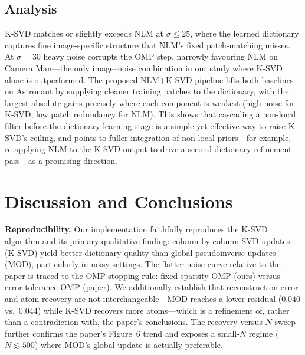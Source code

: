 \documentclass[conference]{IEEEtran}
\begin{document}
\subsection{Analysis}

K-SVD matches or slightly exceeds NLM at $\sigma\leq25$, where
the learned dictionary captures fine image-specific structure
that NLM's fixed patch-matching misses.
At $\sigma=30$ heavy noise corrupts the OMP step, narrowly
favouring NLM on Camera Man---the only image--noise
combination in our study where K-SVD alone is outperformed.
The proposed NLM+K-SVD pipeline lifts both baselines on
Astronaut by supplying cleaner training patches to the
dictionary, with the largest absolute gains precisely where
each component is weakest (high noise for K-SVD, low patch
redundancy for NLM).
This shows that cascading a non-local filter before the
dictionary-learning stage is a simple yet effective way to
raise K-SVD's ceiling, and points to fuller integration of
non-local priors---for example, re-applying NLM to the K-SVD
output to drive a second dictionary-refinement pass---as a
promising direction.

\section{Discussion and Conclusions}

\textbf{Reproducibility.}
Our implementation faithfully reproduces the K-SVD algorithm
and its primary qualitative finding: column-by-column SVD
updates (K-SVD) yield better dictionary quality than global
pseudoinverse updates (MOD), particularly in noisy settings.
The flatter noise curve relative to the paper is traced to the
OMP stopping rule: fixed-sparsity OMP (ours) versus
error-tolerance OMP (paper).  We additionally establish that
reconstruction error and atom recovery are not
interchangeable---MOD reaches a lower residual
($0.040$ vs.\ $0.044$) while K-SVD recovers more atoms---which
is a refinement of, rather than a contradiction with, the
paper's conclusions.
The recovery-versus-$N$ sweep further confirms the paper's
Figure~6 trend and exposes a small-$N$ regime
($N\!\lesssim\!500$) where MOD's global update is actually
preferable.
\end{document}
